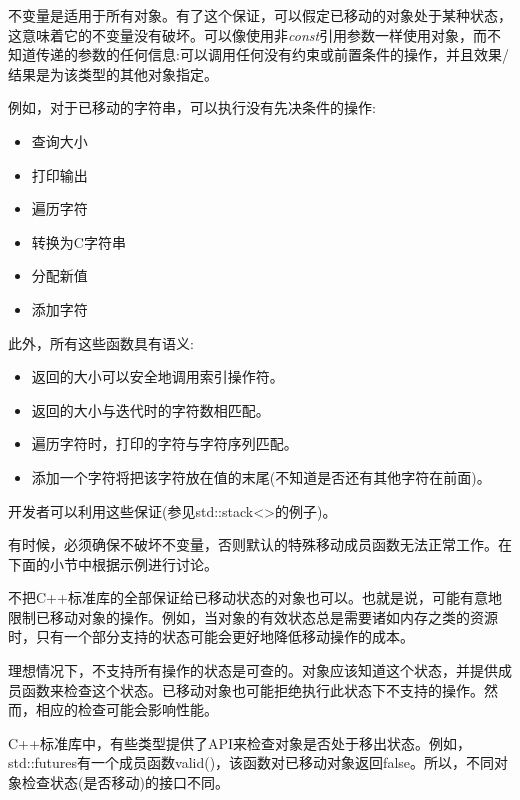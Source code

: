 不变量是适用于所有对象。有了这个保证，可以假定已移动的对象处于某种状态，这意味着它的不变量没有破坏。可以像使用非\textit{const}引用参数一样使用对象，而不知道传递的参数的任何信息:可以调用任何没有约束或前置条件的操作，并且效果/结果是为该类型的其他对象指定。\par

例如，对于已移动的字符串，可以执行没有先决条件的操作:\par

\begin{itemize}
  \item 查询大小
  \item 打印输出
  \item 遍历字符
  \item 转换为C字符串
  \item 分配新值
  \item 添加字符
\end{itemize}

此外，所有这些函数具有语义:\par

\begin{itemize}
  \item 返回的大小可以安全地调用索引操作符。
  \item 返回的大小与迭代时的字符数相匹配。
  \item 遍历字符时，打印的字符与字符序列匹配。
  \item 添加一个字符将把该字符放在值的末尾(不知道是否还有其他字符在前面)。
\end{itemize}

开发者可以利用这些保证(参见std::stack<>的例子)。\par

有时候，必须确保不破坏不变量，否则默认的特殊移动成员函数无法正常工作。在下面的小节中根据示例进行讨论。\par


不把C++标准库的全部保证给已移动状态的对象也可以。也就是说，可能有意地限制已移动对象的操作。例如，当对象的有效状态总是需要诸如内存之类的资源时，只有一个部分支持的状态可能会更好地降低移动操作的成本。\par

理想情况下，不支持所有操作的状态是可查的。对象应该知道这个状态，并提供成员函数来检查这个状态。已移动对象也可能拒绝执行此状态下不支持的操作。然而，相应的检查可能会影响性能。\par

C++标准库中，有些类型提供了API来检查对象是否处于移出状态。例如，std::\allowbreak{}futures有一个成员函数valid()，该函数对已移动对象返回false。所以，不同对象检查状态(是否移动)的接口不同。\par

